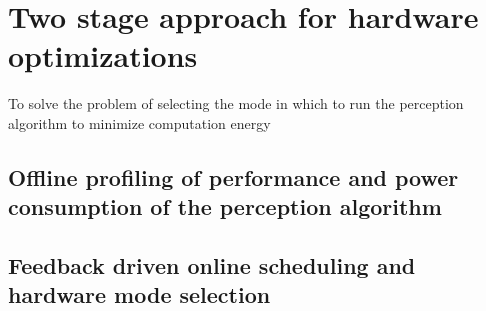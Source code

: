 \section{Two stage approach for hardware optimizations}

To solve the problem of selecting the mode in which to run the perception algorithm to minimize computation energy

\subsection{Offline profiling of performance and power consumption of the perception algorithm}
\label{sec:profiling}


\subsection{Feedback driven online scheduling and hardware mode selection}
\label{sec:scheduling}

